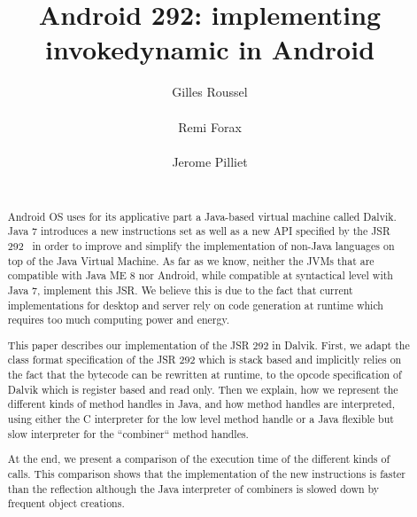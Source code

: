 \documentclass{sig-alternate}
\def \Jsr{JSR\xspace}
\def \JSR{\Jsr 292\xspace}
\def \ANDROID{Android\xspace}
\begin{document}
\title{Android 292: implementing invokedynamic in Android}

\author{
  \alignauthor Gilles Roussel\\
    \\
  \alignauthor Remi Forax\\
    \\
  \alignauthor Jerome Pilliet\\
    \\
}


\maketitle

\begin{abstract}
\ANDROID OS uses for its applicative part a Java-based virtual machine called Dalvik.
Java 7 introduces a new instructions set as well as a new API  specified by the \JSR~\cite{jcp-jsr-292}
in order to improve and simplify the implementation of non-Java languages on top of the Java Virtual Machine.
As far as we know, neither the JVMs that are compatible with Java ME 8 nor
\ANDROID, while compatible at syntactical level with Java 7, implement this \Jsr.
We believe this is due to the fact that current implementations for desktop and server rely
on code generation at runtime which requires too much computing power and energy.

This paper describes our implementation of the \JSR in Dalvik.
First, we adapt the class format specification of the \JSR which is stack based and implicitly relies on the fact that the bytecode
can be rewritten at runtime, to the opcode specification of Dalvik which is register based and read only. 
Then we explain, how we represent the different kinds of method handles in Java, and how method handles are interpreted,
using either the C interpreter for the low level method handle or a Java flexible but slow interpreter for the ``combiner`` method handles.

At the end, we present a comparison of the execution time of the different kinds of calls.
This comparison shows that the implementation of the new instructions is faster than the reflection
although the Java interpreter of combiners is slowed down by frequent object creations.
\end{abstract}
\end{document}
